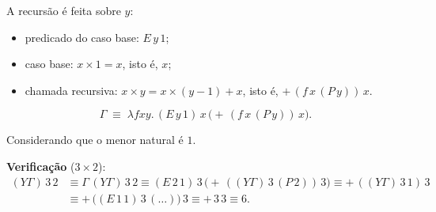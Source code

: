 \begin{solution}
A recursão é feita sobre $y$:
\begin{itemize}
    \item predicado do caso base: $E\,y\,1$;
    \item caso base: $x\times 1 = x$, isto é, $x$;
    \item chamada recursiva: $x\times y = x\times(y-1) + x$, isto é, $+\,(f\,x\,(P\,y))\,x$.
\end{itemize}
\[
    \Gamma \;\equiv\; \lambda fxy.\,(E\,y\,1)\,x\,\bigl(+\,(f\,x\,(P\,y))\,x\bigr).
\]

Considerando que o menor natural é $1$.

\textbf{Verificação} ($3\times 2$):
\begin{align*}
    (Y\Gamma)\,3\,2 &\equiv \Gamma\,(Y\Gamma)\,3\,2
        \equiv (E\,2\,1)\,3\,\bigl(+\,((Y\Gamma)\,3\,(P\,2))\,3\bigr)
        \equiv +\,((Y\Gamma)\,3\,1)\,3 \\
    &\equiv +\,\bigl((E\,1\,1)\,3\,(\ldots)\bigr)\,3
        \equiv +\,3\,3 \equiv 6.
\end{align*}

\end{solution}


